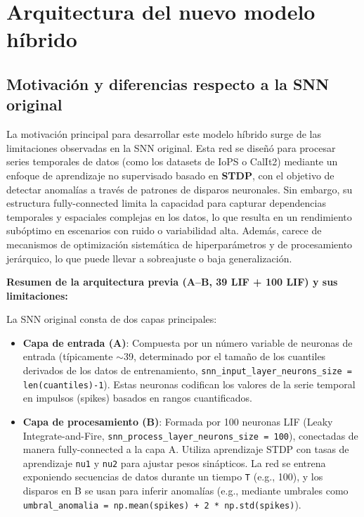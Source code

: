 \section{Arquitectura del nuevo modelo híbrido}

\subsection{ Motivación y diferencias respecto a la SNN original}

La motivación principal para desarrollar este modelo híbrido surge de las limitaciones observadas en la SNN original. Esta red se diseñó para procesar series temporales de datos (como los datasets de IoPS o CalIt2) mediante un enfoque de aprendizaje no supervisado basado en \textbf{STDP}, con el objetivo de detectar anomalías a través de patrones de disparos neuronales. Sin embargo, su estructura fully-connected limita la capacidad para capturar dependencias temporales y espaciales complejas en los datos, lo que resulta en un rendimiento subóptimo en escenarios con ruido o variabilidad alta. Además, carece de mecanismos de optimización sistemática de hiperparámetros y de procesamiento jerárquico, lo que puede llevar a sobreajuste o baja generalización.

\textbf{Resumen de la arquitectura previa (A--B, 39 LIF + 100 LIF) y sus limitaciones:}

La SNN original consta de dos capas principales:
\begin{itemize}
    \item \textbf{Capa de entrada (A)}: Compuesta por un número variable de neuronas de entrada (típicamente $\sim$39, determinado por el tamaño de los cuantiles derivados de los datos de entrenamiento, \texttt{snn\_input\_layer\_neurons\_size = len(cuantiles)-1}). Estas neuronas codifican los valores de la serie temporal en impulsos (spikes) basados en rangos cuantificados.
    \item \textbf{Capa de procesamiento (B)}: Formada por 100 neuronas LIF (Leaky Integrate-and-Fire, \texttt{snn\_process\_layer\_neurons\_size = 100}), conectadas de manera fully-connected a la capa A. Utiliza aprendizaje STDP con tasas de aprendizaje \texttt{nu1} y \texttt{nu2} para ajustar pesos sinápticos. La red se entrena exponiendo secuencias de datos durante un tiempo \texttt{T} (e.g., 100), y los disparos en B se usan para inferir anomalías (e.g., mediante umbrales como \texttt{umbral\_anomalia = np.mean(spikes) + 2 * np.std(spikes)}).
\end{itemize}

